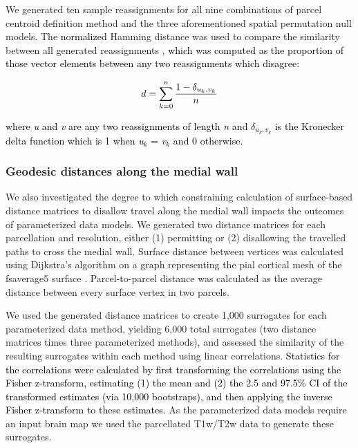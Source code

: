 \documentclass[12pt,aps,pra,reprint,showkeys]{revtex4-1}
\newcommand{\nimg}[1]{\textcolor{black}{{#1}}}
\begin{document}
We generated ten sample reassignments for all nine combinations of parcel centroid definition method and the three aforementioned spatial permutation null models.
The \nimg{normalized} Hamming distance was used to compare the similarity between all generated reassignments \citep{hamming1950distance}, \nimg{which was computed as the proportion of those vector elements between any two reassignments which disagree:}

\begin{equation*}
   \nimg{d = \sum_{k=0}^{n} \frac{1 - \delta_{u_{k},v_{k}}}{n}}
\end{equation*}

\noindent \nimg{where \emph{u} and \emph{v} are any two reassignments of length \emph{n} and $\delta_{u_{k},v_{k}}$ is the Kronecker delta function which is 1 when \emph{u}$_k$ = \emph{v}$_k$ and 0 otherwise.}

\subsubsection*{Geodesic distances along the medial wall}

We also investigated the degree to which constraining calculation of surface-based distance matrices to disallow travel along the medial wall impacts the outcomes of parameterized data models.
We generated two distance matrices for each parcellation and resolution, either (1) permitting or (2) disallowing the travelled paths to cross the medial wall.
Surface distance between vertices was calculated using Dijkstra's algorithm on a graph representing the pial cortical mesh of the fsaverage5 surface \citep{fischl1999humanbrainmap}.
Parcel-to-parcel distance was calculated as the average distance between every surface vertex in two parcels.

We used the generated distance matrices to create 1,000 surrogates for each parameterized data method, yielding 6,000 total surrogates (two distance matrices times three parameterized methods), and assessed the similarity of the resulting surrogates within each method using linear correlations.
\nimg{Statistics for the correlations were calculated by first transforming the correlations using the Fisher z-transform, estimating (1) the mean and (2) the 2.5 and 97.5\% CI of the transformed estimates (via 10,000 bootstraps), and then applying the inverse Fisher z-transform to these estimates.}
As the parameterized data models require an input brain map we used the parcellated T1w/T2w data to generate these surrogates.
\end{document}

